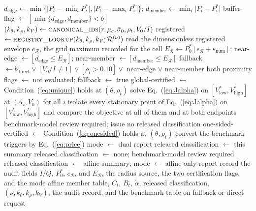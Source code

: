 \documentclass[5p,times,authoryear]{elsarticle}
\theoremstyle{plain}
\newcommand{\sbar}{\bar{\sigma}_0}
\newcommand{\Vlow}{V^{*}_{\mathrm{low}}}
\newcommand{\Vhigh}{V^{*}_{\mathrm{high}}}
\newcommand{\ER}{E_{\mathcal{R}}}
\newcommand{\eR}{e_{\mathcal{R}}}
\newcommand{\dedge}{d_{\mathrm{edge}}}
\newcommand{\dmember}{d_{\mathrm{member}}}
\begin{document}
\begin{algorithm*}[!t]
\begin{algorithmic}[1]
\State $\dedge\gets\min\{\lvert P_t-\min_iP^{*}_{i}\rvert,\lvert P_t-\max_iP^{*}_{i}\rvert\}$; $\dmember\gets\min_i\lvert P_t-P^{*}_{i}\rvert$
\State buffer-flag $\gets[\min\{\dedge,\dmember\}<b]$ 
\State $(k_{\theta},k_{\rho},k_{V})\gets\textsc{canonical\_ids}(r,\mu_c,\sbar,\rho_t,V_0/I)$
\State registered $\gets\textsc{registry\_lookup}(k_{\theta},k_{\rho},k_{V};\mathcal{R}^{(\nu)})$ 
  \State read the dimensionless registered envelope $\eR$, the grid maximum recorded for the cell 
  \State $\ER\gets P^{*}_{0}[\eR+\varepsilon_{\mathrm{num}}]$; near-edge $\gets[\dedge\le\ER]$; near-member $\gets[\dmember\le\ER]$
  \State fallback $\gets b_{\mathrm{direct}}\lor[V_0/I\neq1]\lor[\rho_t>0.10]\lor$ near-edge $\lor$ near-member
\Else
  \State both proximity flags $\gets$ not evaluated; fallback $\gets$ true
\EndIf
{}
  \State global-certified $\gets$ Condition~(\ref{eq:unique}) holds at $(\theta,\rho_t)$
    \State solve Eq.~(\ref{eq:Jalpha}) on $[\Vlow,\Vhigh]$ at $(\alpha_i,V_0)$ for all $i$
  \Else
    \State isolate every stationary point of Eq.~(\ref{eq:Jalpha}) on $[\Vlow,\Vhigh]$ and compare the objective at all of them and at both endpoints
      \State \Return benchmark-model review required; issue no released classification
    \EndIf
  \EndIf
  \State one-sided-certified $\gets$ Condition~(\ref{eq:onesided}) holds at $(\theta,\rho_t)$ 
  \State convert the benchmark triggers by Eq.~(\ref{eq:price})
  \State mode $\gets$ dual report
    \State released classification $\gets$ this summary 
  \Else
    \State released classification $\gets$ none; benchmark-model review required 
  \EndIf
\Else
  \State released classification $\gets$ affine summary; mode $\gets$ affine-only report
\EndIf
\State record the audit fields $I/Q$, $P^{*}_{0}$, $\eR$, and $\ER$, the radius source, the two certification flags, and the mode
\State \Return affine member table, $C_t$, $B_t$, $\tilde{\alpha}$, released classification, $(\nu,k_{\theta},k_{\rho},k_{V})$, the audit record, and the benchmark table on fallback or direct request
\end{algorithmic}
\end{algorithm*}
\end{document}
